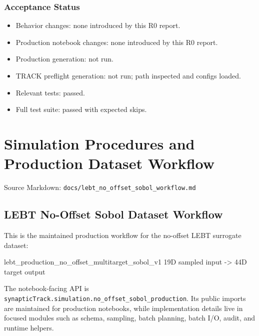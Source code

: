 \documentclass[
]{article}
\newenvironment{Shaded}{}{}
\newcommand{\NormalTok}[1]{#1}
\providecommand{\tightlist}{%
  \setlength{\itemsep}{0pt}\setlength{\parskip}{0pt}}
\begin{document}
\hypertarget{acceptance-status}{%
\subsubsection{Acceptance Status}\label{acceptance-status}}

\begin{itemize}
\tightlist
\item
  Behavior changes: none introduced by this R0 report.
\item
  Production notebook changes: none introduced by this R0 report.
\item
  Production generation: not run.
\item
  TRACK preflight generation: not run; path inspected and configs
  loaded.
\item
  Relevant tests: passed.
\item
  Full test suite: passed with expected skips.
\end{itemize}

\hypertarget{simulation-procedures-and-production-dataset-workflow}{%
\section{Simulation Procedures and Production Dataset
Workflow}\label{simulation-procedures-and-production-dataset-workflow}}

Source Markdown: \texttt{docs/lebt\_no\_offset\_sobol\_workflow.md}

\hypertarget{lebt-no-offset-sobol-dataset-workflow}{%
\subsection{LEBT No-Offset Sobol Dataset
Workflow}\label{lebt-no-offset-sobol-dataset-workflow}}

This is the maintained production workflow for the no-offset LEBT
surrogate dataset:

\begin{Shaded}
\begin{Highlighting}[]
\NormalTok{lebt\_production\_no\_offset\_multitarget\_sobol\_v1}
\NormalTok{19D sampled input {-}\textgreater{} 44D target output}
\end{Highlighting}
\end{Shaded}

The notebook-facing API is
\texttt{synapticTrack.simulation.no\_offset\_sobol\_production}. Its
public imports are maintained for production notebooks, while
implementation details live in focused modules such as schema, sampling,
batch planning, batch I/O, audit, and runtime helpers.
\end{document}
